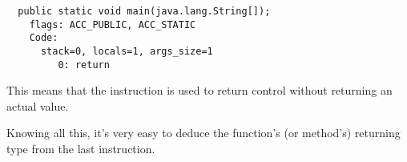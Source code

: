 \begin{lstlisting}
  public static void main(java.lang.String[]);
    flags: ACC_PUBLIC, ACC_STATIC
    Code:
      stack=0, locals=1, args_size=1
         0: return
\end{lstlisting}

This means that the  instruction is used to return control without returning
an actual value.

Knowing all this, it's very easy to deduce the function's (or method's) returning type
from the last instruction.


